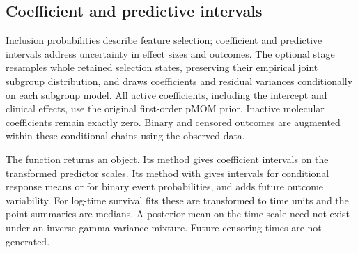 \documentclass[article]{jss}
\begin{document}
\FloatBarrier

\subsection{Coefficient and predictive intervals}

Inclusion probabilities describe feature selection; coefficient and predictive
intervals address uncertainty in effect sizes and outcomes. The optional
 stage
resamples whole retained selection states, preserving their empirical joint
subgroup distribution, and draws coefficients and residual variances
conditionally on each subgroup model. All active coefficients, including the
intercept and clinical effects, use the original first-order pMOM prior.
Inactive molecular coefficients remain exactly zero. Binary and censored
outcomes are augmented within these conditional chains using the observed data.

The function  returns an 
object. Its  method gives coefficient intervals on the
transformed predictor scales. Its  method with
 gives intervals for conditional response means or for
binary event probabilities, and  adds future outcome
variability. For log-time survival fits these are
transformed to time units and the point summaries are medians. A posterior
mean on the time scale need not exist under an inverse-gamma variance mixture.
Future censoring times are not generated.
\end{document}

